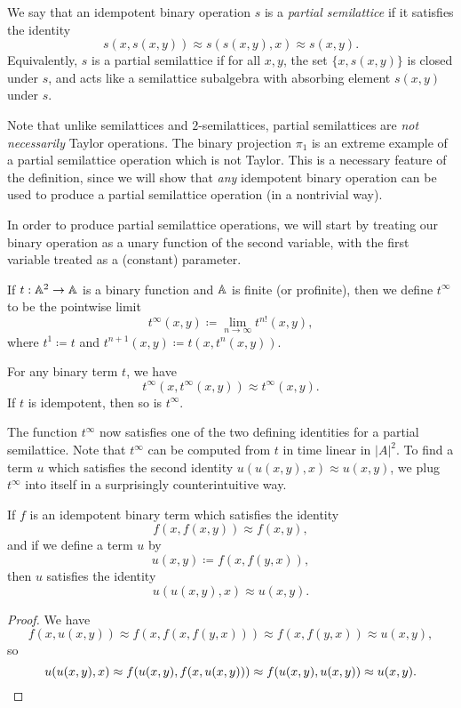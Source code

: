 \documentclass[letterpaper,11pt]{article}
\begin{document}
\begin{defn} We say that an idempotent binary operation $s$ is a \emph{partial semilattice} if it satisfies the identity
\[
s(x,s(x,y)) \approx s(s(x,y),x) \approx s(x,y).
\]
Equivalently, $s$ is a partial semilattice if for all $x,y$, the set $\{x,s(x,y)\}$ is closed under $s$, and acts like a semilattice subalgebra with absorbing element $s(x,y)$ under $s$.
\end{defn}

Note that unlike semilattices and $2$-semilattices, partial semilattices are \emph{not necessarily} Taylor operations. The binary projection $\pi_1$ is an extreme example of a partial semilattice operation which is not Taylor. This is a necessary feature of the definition, since we will show that \emph{any} idempotent binary operation can be used to produce a partial semilattice operation (in a nontrivial way).

In order to produce partial semilattice operations, we will start by treating our binary operation as a unary function of the second variable, with the first variable treated as a (constant) parameter.

\begin{defn} If $t : \mathbb{A}^2 \rightarrow \mathbb{A}$ is a binary function and $\mathbb{A}$ is finite (or profinite), then we define $t^\infty$ to be the pointwise limit
\[
t^\infty(x,y) \coloneqq \lim_{n \rightarrow \infty} t^{n!}(x,y),
\]
where $t^1 \coloneqq t$ and $t^{n+1}(x,y) \coloneqq t(x,t^n(x,y))$.
\end{defn}

\begin{prop} For any binary term $t$, we have
\[
t^\infty(x,t^\infty(x,y)) \approx t^\infty(x,y).
\]
If $t$ is idempotent, then so is $t^\infty$.
\end{prop}

The function $t^\infty$ now satisfies one of the two defining identities for a partial semilattice. Note that $t^\infty$ can be computed from $t$ in time linear in $|A|^2$. To find a term $u$ which satisfies the second identity $u(u(x,y),x) \approx u(x,y)$, we plug $t^\infty$ into itself in a surprisingly counterintuitive way.

\begin{prop} If $f$ is an idempotent binary term which satisfies the identity
\[
f(x,f(x,y)) \approx f(x,y),
\]
and if we define a term $u$ by
\[
u(x,y) \coloneqq f(x,f(y,x)),
\]
then $u$ satisfies the identity
\[
u(u(x,y),x) \approx u(x,y).
\]
\end{prop}
\begin{proof}
We have
\[
f(x,u(x,y)) \approx f(x,f(x,f(y,x))) \approx f(x,f(y,x)) \approx u(x,y),
\]
so
\[
u(u(x,y),x) \approx f(u(x,y),f(x,u(x,y))) \approx f(u(x,y),u(x,y)) \approx u(x,y).\qedhere
\]
\end{proof}
\end{document}
